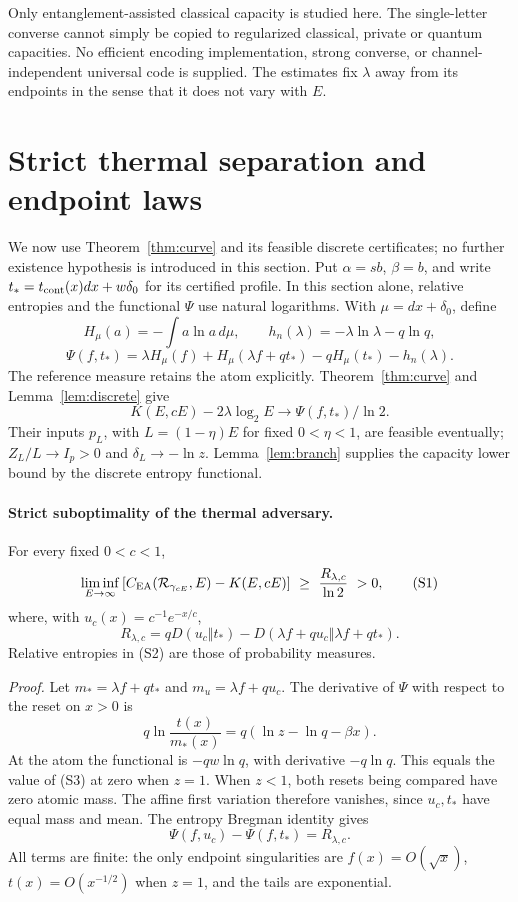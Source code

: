 \documentclass[11pt]{article}
\begin{document}
Only entanglement-assisted classical capacity is studied here. The single-letter converse cannot simply be copied to regularized classical, private or quantum capacities. No efficient encoding implementation, strong converse, or channel-independent universal code is supplied. The estimates fix $\lambda$ away from its endpoints in the sense that it does not vary with $E$.

\section{Strict thermal separation and endpoint laws}
We now use Theorem~\ref{thm:curve} and its feasible discrete certificates;
no further existence hypothesis is introduced in this section. Put
$\alpha=sb$, $\beta=b$, and write $t_*=t_{\rm cont}(x)dx+w\delta_0$
for its certified profile. In this section alone, relative entropies and
the functional $\Psi$ use natural logarithms. With $\mu=dx+\delta_0$, define
\[
 H_\mu(a)=-\int a\ln a\,d\mu,\qquad h_n(\lambda)=-\lambda\ln\lambda-q\ln q,
\]
\[
 \Psi(f,t_*)=\lambda H_\mu(f)+H_\mu(\lambda f+qt_*)-qH_\mu(t_*)-h_n(\lambda).
\]
The reference measure retains the atom explicitly. Theorem~\ref{thm:curve}
and Lemma~\ref{lem:discrete} give
\[
 K(E,cE)-2\lambda\log_2E\longrightarrow\Psi(f,t_*)/\ln2.
\]
Their inputs $p_L$, with $L=(1-\eta)E$ for fixed $0<\eta<1$, are feasible
eventually; $Z_L/L\to I_p>0$ and $\delta_L\to-\ln z$. Lemma~\ref{lem:branch}
supplies the capacity lower bound by the discrete entropy functional.

\paragraph{Strict suboptimality of the thermal adversary.}
For every fixed \(0<c<1\),
\[
 \liminf_{E\to\infty}
 \left[C_{\rm EA}({\cal R}_{\gamma_{cE}},E)-K(E,cE)\right]
 \ \ge\ \frac{R_{\lambda,c}}{\ln2}\ >0,                         \tag{S1}
\]
where, with \(u_c(x)=c^{-1}e^{-x/c}\),
\[
 R_{\lambda,c}
 =qD(u_c\Vert t_*)-
 D(\lambda f+qu_c\Vert\lambda f+qt_*).                          \tag{S2}
\]
Relative entropies in (S2) are those of probability measures.

\emph{Proof.}
Let \(m_*=\lambda f+qt_*\) and \(m_u=\lambda f+qu_c\).
The derivative of \(\Psi\) with respect to the reset on \(x>0\) is
\[
 q\ln\frac{t(x)}{m_*(x)}
       =q(\ln z-\ln q-\beta x).                               \tag{S3}
\]
At the atom the functional is \(-qw\ln q\), with derivative
\(-q\ln q\). This equals the value of (S3) at zero when \(z=1\).
When \(z<1\), both resets being compared have zero atomic mass.
The affine first variation therefore vanishes, since \(u_c,t_*\)
have equal mass and mean. The entropy Bregman identity gives
\[
 \Psi(f,u_c)-\Psi(f,t_*)=R_{\lambda,c}.                         \tag{S4}
\]
All terms are finite: the only endpoint singularities are
\(f(x)=O(\sqrt{x})\), \(t(x)=O(x^{-1/2})\) when \(z=1\), and the
tails are exponential.
\end{document}
